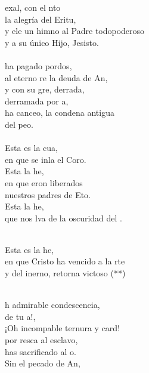 \begin{cancion}
	exal, con el nto \\
	la alegría del Eritu, \\
	y ele un himno al Padre todopoderoso\\
	y a su único Hijo, Jesisto.\\
\jump\\
	 ha pagado pordos,\\
	al eterno re la deuda de An,\\
	y con su gre, derrada,\\
	derramada por a,\\
	ha canceo, la condena antigua\\
	del peo.\\
\jump\\
	Esta es la cua,\\
	en que se inla el Coro.\\
	Esta  la he,\\
	en que eron liberados\\
	nuestros padres de Eto.\\
	Esta  la he,\\
	que nos lva de la oscuridad del .\\\jump\\
	\begin{chorus}%
	Esta es la he,\\
	en que Cristo ha vencido a la rte\\
	y del inerno, retorna victoso (**)\\
	\end{chorus}%
	\jump\\
	h admirable condescencia,\\
	de tu a!,\\
	¡Oh incompable ternura y card!\\
	por resca al esclavo,\\
	has sacrificado al o.\\
	Sin el pecado de An,\\

\end{cancion}
